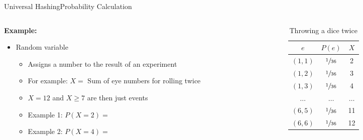 \begin{frame}{Universal Hashing}{Probability Calculation}
  \begin{columns}
    \begin{column}{0.55\linewidth}
      \textbf{Example:}
      \begin{itemize}
      \setlength\itemsep{1em}
      \item <1->
        Random variable 
        \begin{itemize}
        \item <2->
        Assigns a number to the result of an experiment          
        \item <3->
        For example: {\color{Mittel-Blau}$X =$} Sum of eye numbers for rolling twice  
        \item <4->
          {\color{Mittel-Blau}$X = 12$} and {\color{Mittel-Blau}$X \geq 7$} are then just events
        \item <5->
          Example 1: {\color{Mittel-Blau}$P(X = 2) = $}
        \item <6->
          Example 2: {\color{Mittel-Blau}$P(X = 4) = $}  
        \end{itemize}
      \end{itemize}
    \end{column}
    \begin{column}{0.45\linewidth}
      \begin{table}[!h]
        \caption{Throwing a dice twice}
        \label{tab:probabilities:rolling_dice_twice2}
        \begin{tabularx}{0.95\linewidth}{c|cc}
          {\color{Mittel-Blau}$e$} & {\color{Mittel-Blau}$P(e)$} & {\color{Mittel-Blau}$X$}\\
          \midrule
          $(1, 1)$ & $\sfrac{1}{36}$ & 2\\
          $(1, 2)$ & $\sfrac{1}{36}$ & 3\\
          $(1, 3)$ & $\sfrac{1}{36}$ & 4\\
          $\dots$ & $\dots$ & $\dots$\\
          $(6, 5)$ & $\sfrac{1}{36}$ & 11\\
          $(6, 6)$ & $\sfrac{1}{36}$ & 12\\
        \end{tabularx}
      \end{table}
    \end{column}
  \end{columns}
\end{frame}


